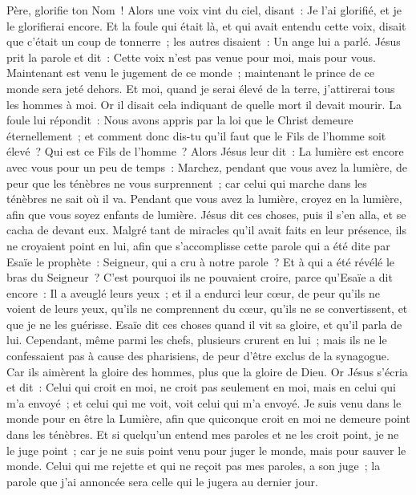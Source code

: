 \begin{multicols}{2}
Père, glorifie ton Nom~! Alors une voix vint du ciel, disant~: Je l'ai glorifié, et je le glorifierai encore.
Et la foule qui était là, et qui avait entendu cette voix, disait que c'était un coup de tonnerre~; les autres disaient~: Un ange lui a parlé.
Jésus prit la parole et dit~: Cette voix n'est pas venue pour moi, mais pour vous.
Maintenant est venu le jugement de ce monde~; maintenant le prince de ce monde sera jeté dehors.
Et moi, quand je serai élevé de la terre, j'attirerai tous les hommes à moi.
Or il disait cela indiquant de quelle mort il devait mourir.
La foule lui répondit~: Nous avons appris par la loi que le Christ demeure éternellement~; et comment donc dis-tu qu'il faut que le Fils de l'homme soit élevé~? Qui est ce Fils de l'homme~?
Alors Jésus leur dit~: La lumière est encore avec vous pour un peu de temps~: Marchez, pendant que vous avez la lumière, de peur que les ténèbres ne vous surprennent~; car celui qui marche dans les ténèbres ne sait où il va.
Pendant que vous avez la lumière, croyez en la lumière, afin que vous soyez enfants de lumière. Jésus dit ces choses, puis il s'en alla, et se cacha de devant eux.
Malgré tant de miracles qu'il avait faits en leur présence, ils ne croyaient point en lui,
afin que s'accomplisse cette parole qui a été dite par Esaïe le prophète~: Seigneur, qui a cru à notre parole~? Et à qui a été révélé le bras du Seigneur~?
C'est pourquoi ils ne pouvaient croire, parce qu'Esaïe a dit encore~:
Il a aveuglé leurs yeux~; et il a endurci leur cœur, de peur qu'ils ne voient de leurs yeux, qu'ils ne comprennent du cœur, qu'ils ne se convertissent, et que je ne les guérisse.
Esaïe dit ces choses quand il vit sa gloire, et qu'il parla de lui.
Cependant, même parmi les chefs, plusieurs crurent en lui~; mais ils ne le confessaient pas à cause des pharisiens, de peur d'être exclus de la synagogue.
Car ils aimèrent la gloire des hommes, plus que la gloire de Dieu.
Or Jésus s'écria et dit~: Celui qui croit en moi, ne croit pas seulement en moi, mais en celui qui m'a envoyé~;
et celui qui me voit, voit celui qui m'a envoyé.
Je suis venu dans le monde pour en être la Lumière, afin que quiconque croit en moi ne demeure point dans les ténèbres.
Et si quelqu'un entend mes paroles et ne les croit point, je ne le juge point~; car je ne suis point venu pour juger le monde, mais pour sauver le monde.
Celui qui me rejette et qui ne reçoit pas mes paroles, a son juge~; la parole que j'ai annoncée sera celle qui le jugera au dernier jour.

\end{multicols}
